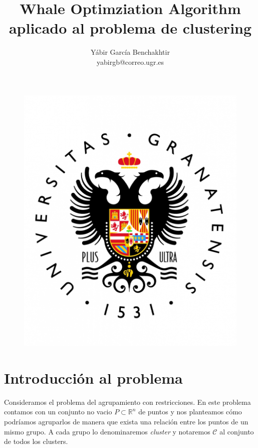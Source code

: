 \documentclass[11pt]{article}
\title{Whale Optimziation Algorithm aplicado al problema de clustering}
\author{Yábir García Benchakhtir\\yabirgb@correo.ugr.es}
\begin{document}
\maketitle

\begin{figure}[h]
\includegraphics[scale=0.3]{UGR}
\centering
\end{figure}

\newpage

\renewcommand*\contentsname{Índice}
\tableofcontents

\newpage

\section{Introducción al problema}


Consideramos el problema del agrupamiento con restricciones. En este
problema contamos con un conjunto no vacio $P \subset \mathbb{R}^n$ de
puntos y nos planteamos cómo podríamos agruparlos de manera que exista
una relación entre los puntos de un mismo grupo. A cada grupo lo
denominaremos \textit{cluster} y notaremos $\mathcal{C}$ al conjunto
de todos los clusters.
\end{document}
